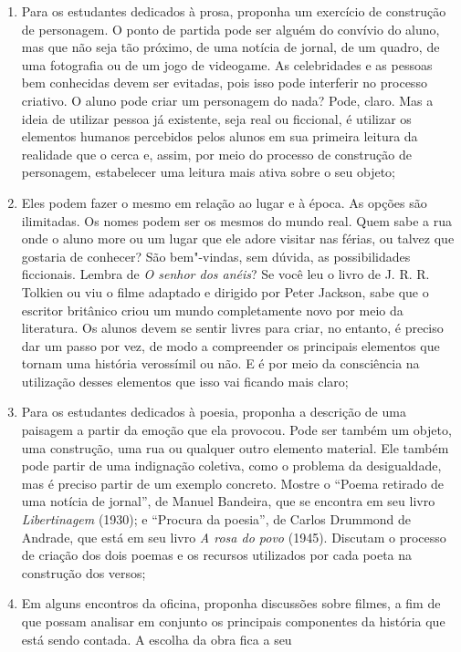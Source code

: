\documentclass[12pt]{extarticle}
\begin{document}
\begin{enumerate}
\item
  Para os estudantes dedicados à prosa, proponha um exercício de
  construção de personagem. O ponto de partida pode ser alguém do
  convívio do aluno, mas que não seja tão próximo, de uma notícia de
  jornal, de um quadro, de uma fotografia ou de um jogo de videogame. As
  celebridades e as pessoas bem conhecidas devem ser evitadas, pois isso
  pode interferir no processo criativo. O aluno pode criar um personagem
  do nada? Pode, claro. Mas a ideia de utilizar pessoa já existente,
  seja real ou ficcional, é utilizar os elementos humanos percebidos
  pelos alunos em sua primeira leitura da realidade que o cerca e,
  assim, por meio do processo de construção de personagem, estabelecer
  uma leitura mais ativa sobre o seu objeto;
\item
  Eles podem fazer o mesmo em relação ao lugar e à época. As opções são
  ilimitadas. Os nomes podem ser os mesmos do mundo real. Quem sabe a
  rua onde o aluno more ou um lugar que ele adore visitar nas férias, ou
  talvez que gostaria de conhecer? São bem"-vindas, sem dúvida, as
  possibilidades ficcionais. Lembra de \emph{O senhor dos anéis}? Se
  você leu o livro de J. R. R. Tolkien ou viu o filme adaptado e
  dirigido por Peter Jackson, sabe que o escritor britânico criou um
  mundo completamente novo por meio da literatura. Os alunos devem se
  sentir livres para criar, no entanto, é preciso dar um passo por vez,
  de modo a compreender os principais elementos que tornam uma história
  verossímil ou não. E é por meio da consciência na utilização desses
  elementos que isso vai ficando mais claro;
\item
  Para os estudantes dedicados à poesia, proponha a descrição de uma
  paisagem a partir da emoção que ela provocou. Pode ser também um
  objeto, uma construção, uma rua ou qualquer outro elemento material.
  Ele também pode partir de uma indignação coletiva, como o problema da
  desigualdade, mas é preciso partir de um exemplo concreto. Mostre o
  ``Poema retirado de uma notícia de jornal'', de Manuel Bandeira, que
  se encontra em seu livro \emph{Libertinagem} (1930); e ``Procura da
  poesia'', de Carlos Drummond de Andrade, que está em seu livro \emph{A
  rosa do povo} (1945). Discutam o processo de criação dos dois poemas e
  os recursos utilizados por cada poeta na construção dos versos;
\item
  Em alguns encontros da oficina, proponha discussões sobre filmes, a
  fim de que possam analisar em conjunto os principais componentes da
  história que está sendo contada. A escolha da obra fica a seu

\end{enumerate}
\end{document}
